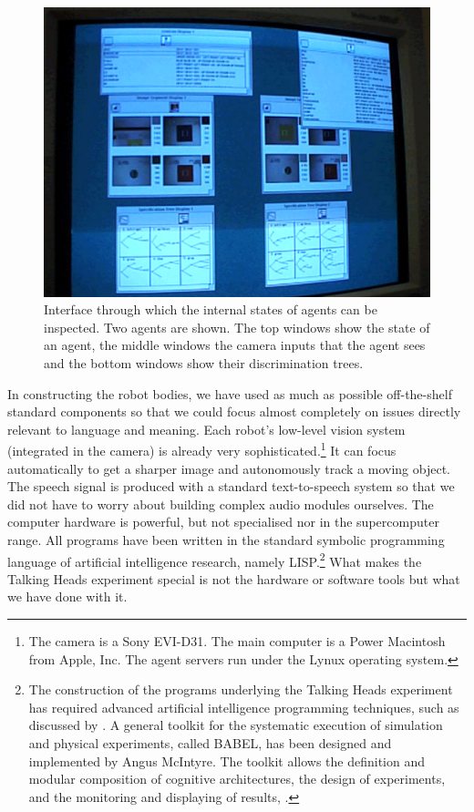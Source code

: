 \begin{figure}[htbp]
  \centerline{\includegraphics[width=.60\textwidth]{chap1/figs/interface.pdf}}
\caption{\small Interface through which the internal states of agents can 
be inspected. Two agents are shown. The top windows show the state of an agent, 
the middle windows the camera inputs that the agent sees and the bottom windows show 
their discrimination trees.}
\label{f:agentview}
\end{figure}

In constructing the robot bodies, we have used as much as
possible off-the-shelf standard 
components so that we could focus almost completely on issues
directly relevant to language and meaning.
Each robot's low-level vision system
(integrated in the camera) is already very sophisticated.\footnote{
The camera is a Sony EVI-D31. The main computer is a Power 
Macintosh from Apple, Inc. The agent servers run under the 
Lynux operating system.}
It can focus automatically to get a sharper image
and autonomously track a moving object. The speech signal is 
produced with a standard text-to-speech system 
so that we did not have to 
worry about building complex audio modules ourselves.
The computer hardware 
is powerful, but not specialised nor in the supercomputer 
range. All programs have been written in the standard symbolic 
programming language of artificial intelligence 
research, namely LISP.\footnote{
The construction of the programs underlying the 
Talking Heads experiment has required advanced
artificial intelligence programming techniques, 
such as discussed by \cite{Norvig:1996}. A general
toolkit for the systematic execution of 
simulation and physical experiments, called BABEL, has been
designed and implemented by Angus McIntyre. The 
toolkit allows the definition and modular composition
of cognitive architectures, the design of 
experiments, and the monitoring and displaying of 
results, \cite{McIntyre:1998}.} What makes the Talking Heads experiment
special is not the hardware or software tools
but what we have done with it.

